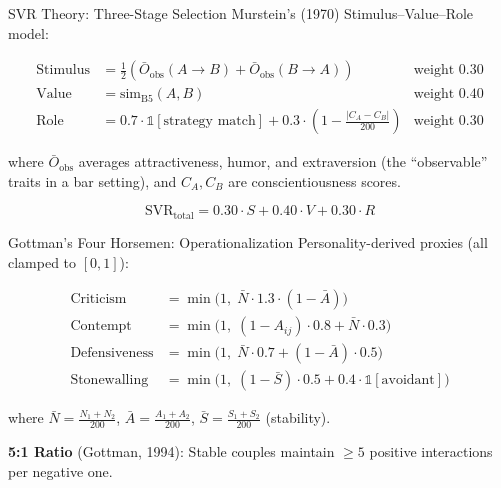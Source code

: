 \documentclass[aspectratio=169, 11pt]{beamer}
\begin{document}
\begin{frame}{SVR Theory: Three-Stage Selection}
Murstein's (1970) Stimulus--Value--Role model:

\begin{align*}
\text{Stimulus} &= \frac{1}{2}\left(\bar{O}_{\text{obs}}(A \to B) + \bar{O}_{\text{obs}}(B \to A)\right) & \text{weight } 0.30 \\[0.5em]
\text{Value} &= \text{sim}_{\text{B5}}(A, B) & \text{weight } 0.40 \\[0.5em]
\text{Role} &= 0.7 \cdot \mathbb{1}[\text{strategy match}] + 0.3 \cdot (1 - \tfrac{|C_A - C_B|}{200}) & \text{weight } 0.30
\end{align*}

\vspace{0.5em}
where $\bar{O}_{\text{obs}}$ averages attractiveness, humor, and extraversion (the ``observable'' traits in a bar setting), and $C_A, C_B$ are conscientiousness scores.

\[
\text{SVR}_{\text{total}} = 0.30 \cdot S + 0.40 \cdot V + 0.30 \cdot R
\]
\end{frame}

\begin{frame}{Gottman's Four Horsemen: Operationalization}
Personality-derived proxies (all clamped to $[0, 1]$):

\begin{align*}
\text{Criticism} &= \min\!\Big(1,\; \bar{N} \cdot 1.3 \cdot (1 - \bar{A})\Big) \\[0.3em]
\text{Contempt} &= \min\!\Big(1,\; (1 - A_{ij}) \cdot 0.8 + \bar{N} \cdot 0.3\Big) \\[0.3em]
\text{Defensiveness} &= \min\!\Big(1,\; \bar{N} \cdot 0.7 + (1 - \bar{A}) \cdot 0.5\Big) \\[0.3em]
\text{Stonewalling} &= \min\!\Big(1,\; (1 - \bar{S}) \cdot 0.5 + 0.4 \cdot \mathbb{1}[\text{avoidant}]\Big)
\end{align*}

where $\bar{N} = \frac{N_1 + N_2}{200}$, $\bar{A} = \frac{A_1 + A_2}{200}$, $\bar{S} = \frac{S_1 + S_2}{200}$ (stability).

\vspace{0.5em}
\textbf{5:1 Ratio} (Gottman, 1994): Stable couples maintain $\geq 5$ positive interactions per negative one.
\end{frame}
\end{document}
